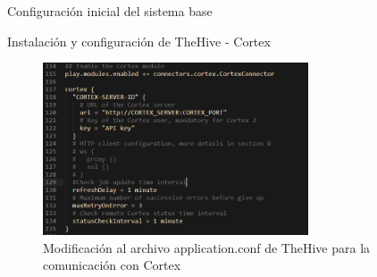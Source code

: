 \begin{section}{Configuración inicial del sistema base}
\begin{subsection}{Instalación y configuración de TheHive - Cortex}
        \begin{figure}[H]
            \centering
            \includegraphics[width=0.7\textwidth]{./iteracion_1_imagenes/figura_40_thehive_cortex_conf.png}
            \caption{Modificación al archivo application.conf de TheHive para la comunicación con Cortex}
            \label{fig:figura_40_thehive_cortex_conf}
        \end{figure}
        \end{subsection}
    \end{section}
    
